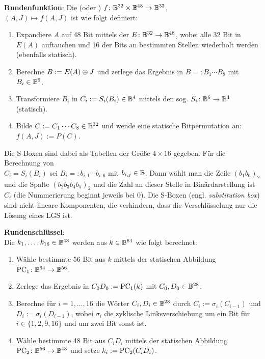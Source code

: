 \textbf{Rundenfunktion}:
Die  (oder )
$f\colon \mathbb{B}^{32} \times \mathbb{B}^{48} \rightarrow \mathbb{B}^{32}$,\\
$(A,J) \mapsto f(A,J)$
ist wie folgt definiert:
\begin{enumerate}
    \item
    Expandiere $A$ auf 48 Bit mittels der 
    $E\colon \mathbb{B}^{32} \rightarrow \mathbb{B}^{48}$,
    wobei alle 32 Bit in $E(A)$ auftauchen und 16 der Bits an bestimmten Stellen wiederholt werden
    (ebenfalls statisch).
    
    \item
    Berechne $B := E(A) \oplus J$ und zerlege das Ergebnis in $B =: B_1 \cdots B_8$ mit
    $B_i \in \mathbb{B}^6$.
    
    \item
    Transformiere $B_i$ in $C_i := S_i(B_i) \in \mathbb{B}^4$ mittels den sog. 
    $S_i\colon \mathbb{B}^6 \rightarrow \mathbb{B}^4$
    (statisch).
    
    \item
    Bilde $C := C_1 \cdots C_8 \in \mathbb{B}^{32}$ und wende eine statische Bitpermutation an:
    $f(A, J) := P(C)$.
\end{enumerate}
Die S-Boxen sind dabei als Tabellen der Größe $4 \times 16$ gegeben.
Für die Berechnung von\\
$C_i = S_i(B_i)$ sei $B_i =: b_{i,1} \cdots b_{i,6}$ mit
$b_{i,j} \in \mathbb{B}$.
Dann wählt man die Zeile $(b_1 b_6)_2$ und die Spalte $(b_2 b_3 b_4 b_5)_2$ und die Zahl an dieser
Stelle in Binärdarstellung ist $C_i$
(die Nummerierung beginnt jeweils bei $0$).
Die S-Boxen (engl. \emph{substitution box}) sind nicht-lineare Komponenten, die verhindern,
dass die Verschlüsselung nur die Lösung eines LGS ist.

\textbf{Rundenschlüssel}:\\
Die  $k_1, \dotsc, k_{16} \in \mathbb{B}^{48}$ werden aus
$k \in \mathbb{B}^{64}$ wie folgt berechnet:
\begin{enumerate}
    \item
    Wähle bestimmte 56 Bit aus $k$ mittels der statischen Abbildung
    $\operatorname{PC}_1\colon \mathbb{B}^{64} \rightarrow \mathbb{B}^{56}$.
    
    \item
    Zerlege das Ergebnis in $C_0 D_0 := \operatorname{PC}_1(k)$ mit $C_0, D_0 \in \mathbb{B}^{28}$.
    
    \item
    Berechne für $i = 1, \dotsc, 16$ die Wörter $C_i, D_i \in \mathbb{B}^{28}$ durch
    $C_i := \sigma_i(C_{i-1})$ und\\
    $D_i := \sigma_i(D_{i-1})$, wobei $\sigma_i$ die zyklische Linksverschiebung um ein Bit
    für $i \in \{1, 2, 9, 16\}$ und um zwei Bit sonst ist.
    
    \item
    Wähle bestimmte 48 Bit aus $C_i D_i$ mittels der statischen Abbildung
    $\operatorname{PC}_2\colon \mathbb{B}^{56} \rightarrow \mathbb{B}^{48}$ und setze
    $k_i := \operatorname{PC}_2(C_i D_i)$.
\end{enumerate}

